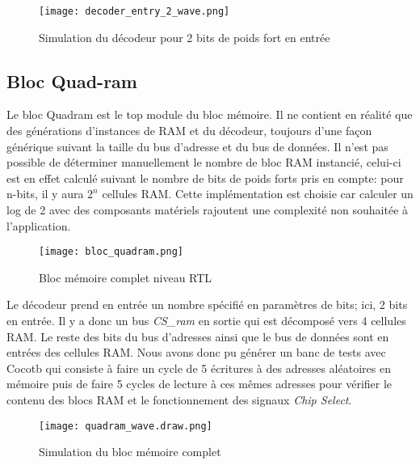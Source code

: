 \begin{figure}[h]
	\centering
	\texttt{[image: decoder\_entry\_2\_wave.png]}
	\caption{Simulation du décodeur pour 2 bits de poids fort en entrée}
	\label{fig:wave_bloc_decoder}
\end{figure}

\newpage

\subsection{Bloc Quad-ram}

\indent Le bloc Quadram est le top module du bloc mémoire.
Il ne contient en réalité que des générations d'instances de RAM et du décodeur, toujours d'une façon générique suivant la taille du bus d'adresse et du bus de données.
Il n'est pas possible de déterminer manuellement le nombre de bloc RAM instancié, celui-ci est en effet calculé suivant le nombre de bits de poids forts pris en compte: pour n-bits, il y aura $ 2^{n} $ cellules RAM. Cette implémentation est choisie car calculer un log de 2 avec des composants matériels rajoutent une complexité non souhaitée à l'application.

\begin{figure}[h]
	\centering
	\texttt{[image: bloc\_quadram.png]}
	\caption{Bloc mémoire complet niveau RTL}
	\label{fig:synth_bloc_quadram}
\end{figure}

\indent Le décodeur prend en entrée un nombre spécifié en paramètres de bits; ici, 2 bits en entrée. 
Il y a donc un bus \textit{CS\_ram} en sortie qui est décomposé vers 4 cellules RAM. 
Le reste des bits du bus d'adresses ainsi que le bus de données sont en entrées des cellules RAM.
Nous avons donc pu générer un banc de tests avec Cocotb qui consiste à faire un cycle de 5 écritures à des adresses aléatoires en mémoire puis de faire 5 cycles de lecture à ces mêmes adresses pour vérifier le contenu des blocs RAM et le fonctionnement des signaux \textit{Chip Select}.

\newpage

\begin{figure}[h]
	\centering
	\texttt{[image: quadram\_wave.draw.png]}
	\caption{Simulation du bloc mémoire complet}
	\label{fig:wave_bloc_quadram}
\end{figure}

